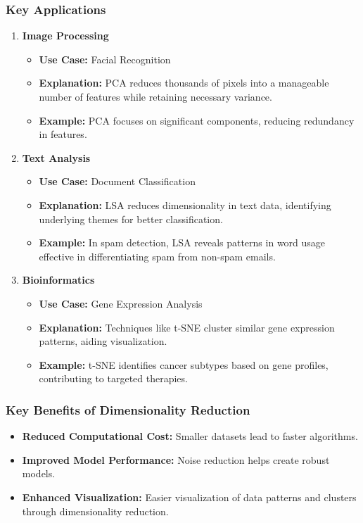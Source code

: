 \documentclass[aspectratio=169]{beamer}
\begin{document}
\begin{frame}[fragile]
    \frametitle{Key Applications}
    \begin{enumerate}
        \item \textbf{Image Processing}
        \begin{itemize}
            \item \textbf{Use Case:} Facial Recognition
            \item \textbf{Explanation:} PCA reduces thousands of pixels into a manageable number of features while retaining necessary variance.
            \item \textbf{Example:} PCA focuses on significant components, reducing redundancy in features.
        \end{itemize}

        \item \textbf{Text Analysis}
        \begin{itemize}
            \item \textbf{Use Case:} Document Classification
            \item \textbf{Explanation:} LSA reduces dimensionality in text data, identifying underlying themes for better classification.
            \item \textbf{Example:} In spam detection, LSA reveals patterns in word usage effective in differentiating spam from non-spam emails.
        \end{itemize}

        \item \textbf{Bioinformatics}
        \begin{itemize}
            \item \textbf{Use Case:} Gene Expression Analysis
            \item \textbf{Explanation:} Techniques like t-SNE cluster similar gene expression patterns, aiding visualization.
            \item \textbf{Example:} t-SNE identifies cancer subtypes based on gene profiles, contributing to targeted therapies.
        \end{itemize}
    \end{enumerate}
\end{frame}

\begin{frame}[fragile]
    \frametitle{Key Benefits of Dimensionality Reduction}
    \begin{itemize}
        \item \textbf{Reduced Computational Cost:} Smaller datasets lead to faster algorithms.
        \item \textbf{Improved Model Performance:} Noise reduction helps create robust models.
        \item \textbf{Enhanced Visualization:} Easier visualization of data patterns and clusters through dimensionality reduction.
    \end{itemize}
\end{frame}
\end{document}
